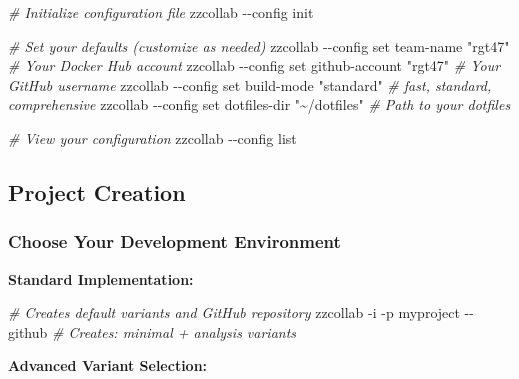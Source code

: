 \documentclass[
]{article}
\newenvironment{Shaded}{\begin{snugshade}}{\end{snugshade}}
\newcommand{\AttributeTok}[1]{\textcolor[rgb]{0.13,0.29,0.53}{#1}}
\newcommand{\CommentTok}[1]{\textcolor[rgb]{0.56,0.35,0.01}{\textit{#1}}}
\newcommand{\ExtensionTok}[1]{#1}
\newcommand{\NormalTok}[1]{#1}
\newcommand{\StringTok}[1]{\textcolor[rgb]{0.31,0.60,0.02}{#1}}
\begin{document}
\begin{Shaded}
\begin{Highlighting}[]
\CommentTok{\# Initialize configuration file}
\ExtensionTok{zzcollab} \AttributeTok{{-}{-}config}\NormalTok{ init}

\CommentTok{\# Set your defaults (customize as needed)}
\ExtensionTok{zzcollab} \AttributeTok{{-}{-}config}\NormalTok{ set team{-}name }\StringTok{"rgt47"}              \CommentTok{\# Your Docker Hub account}
\ExtensionTok{zzcollab} \AttributeTok{{-}{-}config}\NormalTok{ set github{-}account }\StringTok{"rgt47"}        \CommentTok{\# Your GitHub username  }
\ExtensionTok{zzcollab} \AttributeTok{{-}{-}config}\NormalTok{ set build{-}mode }\StringTok{"standard"}         \CommentTok{\# fast, standard, comprehensive}
\ExtensionTok{zzcollab} \AttributeTok{{-}{-}config}\NormalTok{ set dotfiles{-}dir }\StringTok{"\textasciitilde{}/dotfiles"}     \CommentTok{\# Path to your dotfiles}

\CommentTok{\# View your configuration}
\ExtensionTok{zzcollab} \AttributeTok{{-}{-}config}\NormalTok{ list}
\end{Highlighting}
\end{Shaded}

\subsection{Project Creation}\label{project-creation}

\subsubsection{Choose Your Development
Environment}\label{choose-your-development-environment}

\textbf{Standard Implementation:}

\begin{Shaded}
\begin{Highlighting}[]
\CommentTok{\# Creates default variants and GitHub repository}
\ExtensionTok{zzcollab} \AttributeTok{{-}i} \AttributeTok{{-}p}\NormalTok{ myproject }\AttributeTok{{-}{-}github}    \CommentTok{\# Creates: minimal + analysis variants}
\end{Highlighting}
\end{Shaded}

\textbf{Advanced Variant Selection:}
\end{document}
